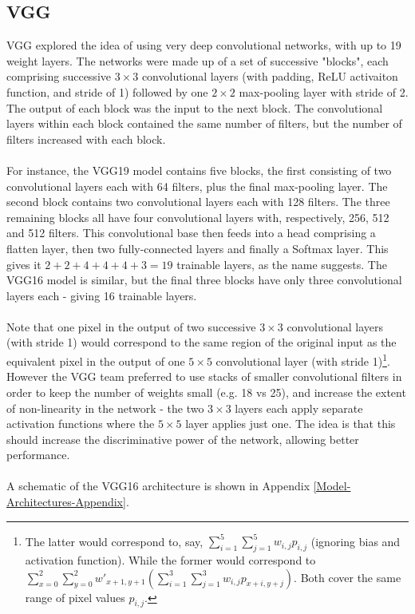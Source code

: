 \documentclass[11pt]{article} %
\theoremstyle{plain}
\theoremstyle{definition}
\begin{document}
\subsection{VGG}
VGG \cite{VGG_Paper} explored the idea of using very deep convolutional networks, with up to 19 weight layers. The networks were made up of a set of successive "blocks", each comprising successive \(3 \times 3\)  convolutional layers (with padding, ReLU activaiton function, and stride of 1) followed by one \(2 \times 2\) max-pooling layer with stride of 2. The output of each block was the input to the next block. The convolutional layers within each block contained the same number of filters, but the number of filters increased with each block. 
\\
\\
\noindent
For instance, the VGG19 model contains five blocks, the first consisting of two convolutional layers each with 64 filters, plus the final max-pooling layer. The second block contains two convolutional layers each with 128 filters. The three remaining blocks all have four convolutional layers with, respectively, 256, 512 and 512 filters. This convolutional base then feeds into a head comprising a flatten layer, then two fully-connected layers and finally a Softmax layer. This gives it \(2 + 2 + 4 + 4 + 4 + 3 = 19\) trainable layers, as the name suggests. The VGG16 model is similar, but the final three blocks have only three convolutional layers each - giving 16 trainable layers. 
\\
\\
\noindent
Note that one pixel in the output of two successive \(3 \times 3\) convolutional layers (with stride 1) would correspond to the same region of the original input as the equivalent pixel in the output of one \(5 \times 5\) convolutional layer (with stride 1)\footnote{The latter would correspond to, say, \( \sum_{i=1}^5 \sum_{j=1}^5 w_{i,j}p_{i,j} \) (ignoring bias and activation function). While the former would correspond to \( \sum_{x=0}^2 \sum_{y=0}^2 w'_{x+1,y+1}(\sum_{i=1}^3 \sum_{j=1}^3 w_{i,j}p_{x+i,y+j}) \). Both cover the same range of pixel values \(p_{i,j}\).}. However the VGG team preferred to use stacks of smaller convolutional filters in order to keep the number of weights small (e.g. 18 vs 25), and increase the extent of non-linearity in the network - the two \(3 \times 3\) layers each apply separate activation functions where the \(5 \times 5\) layer applies just one. The idea is that this should increase the discriminative power of the network, allowing better performance.
\\
\\
\noindent
A schematic of the VGG16 architecture is shown in Appendix \ref{Model-Architectures-Appendix}.
\end{document}
